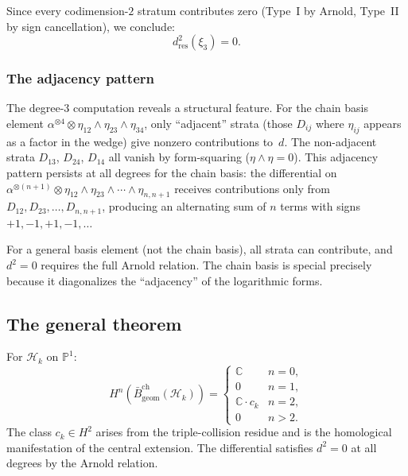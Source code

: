 \medskip
Since every codimension-$2$ stratum contributes zero (Type~I
by Arnold, Type~II by sign cancellation), we conclude:
\begin{equation}\label{eq:frame-dsquared-deg3}
\boxed{d_{\mathrm{res}}^2(\xi_3) = 0.}
\end{equation}

\subsubsection*{The adjacency pattern}

The degree-$3$ computation reveals a structural feature.  For
the chain basis element
$\alpha^{\otimes 4} \otimes \eta_{12} \wedge \eta_{23} \wedge \eta_{34}$,
only ``adjacent'' strata (those $D_{ij}$ where $\eta_{ij}$ appears
as a factor in the wedge) give nonzero contributions to~$d$.
The non-adjacent strata $D_{13}$, $D_{24}$, $D_{14}$ all vanish
by form-squaring ($\eta \wedge \eta = 0$).  This adjacency
pattern persists at all degrees for the chain basis: the
differential on
$\alpha^{\otimes(n+1)} \otimes \eta_{12} \wedge \eta_{23}
\wedge \cdots \wedge \eta_{n,n+1}$
receives contributions only from $D_{12}, D_{23}, \ldots, D_{n,n+1}$,
producing an alternating sum of $n$ terms with signs
$+1, -1, +1, -1, \ldots\,$

For a general basis element (not the chain basis), all strata can
contribute, and $d^2 = 0$ requires the full Arnold relation.
The chain basis is special precisely because it diagonalizes the
``adjacency'' of the logarithmic forms.

\subsection{The general theorem}

\begin{theorem}
\label{thm:frame-heisenberg-bar}
For $\mathcal{H}_k$ on $\mathbb{P}^1$:
\begin{equation}\label{eq:frame-heisenberg-bar-cohomology}
H^n(\bar{B}^{\mathrm{ch}}_{\mathrm{geom}}(\mathcal{H}_k))
= \begin{cases}
\mathbb{C} & n = 0, \\
0 & n = 1, \\
\mathbb{C} \cdot c_k & n = 2, \\
0 & n > 2.
\end{cases}
\end{equation}
The class $c_k \in H^2$ arises from the triple-collision residue
and is the homological manifestation of the central extension.
The differential satisfies $d^2 = 0$ at all degrees by the
Arnold relation.
\end{theorem}

